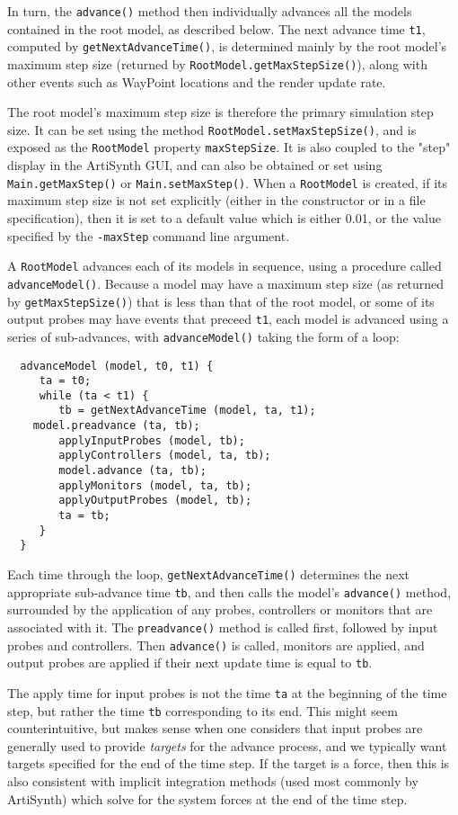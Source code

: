\documentclass{article}
\begin{document}
In turn, the {\tt advance()} method then individually advances all the
models contained in the root model, as described below.  The next
advance time {\tt t1}, computed by {\tt getNextAdvanceTime()}, is
determined mainly by the root model's maximum step size (returned by
{\tt RootModel.getMaxStep\-Size()}), along with other events such as
WayPoint locations and the render update rate.

The root model's maximum step size is therefore the primary simulation
step size. It can be set using the method
{\tt RootModel.setMaxStepSize()}, and is exposed as the {\tt RootModel}
property {\tt maxStepSize}.  It is also coupled to the "step" display in
the ArtiSynth GUI, and can also be obtained or set using
{\tt Main.getMaxStep()} or {\tt Main.setMaxStep()}. When a {\tt RootModel} is
created, if its maximum step size is not set explicitly (either in the
constructor or in a file specification), then it is set to a default
value which is either 0.01, or the value specified by the {\tt -maxStep}
command line argument.

A {\tt RootModel} advances each of its models in sequence, using a
procedure called {\tt advanceModel()}. Because a model may have a
maximum step size (as returned by {\tt getMaxStepSize()}) that is less
than that of the root model, or some of its output probes may have
events that preceed {\tt t1}, each model is advanced using
a series of sub-advances, with {\tt advanceModel()} taking the
form of a loop:
\begin{lstlisting}
  advanceModel (model, t0, t1) {
     ta = t0;
     while (ta < t1) {
        tb = getNextAdvanceTime (model, ta, t1);
	model.preadvance (ta, tb);
        applyInputProbes (model, tb);
        applyControllers (model, ta, tb);
        model.advance (ta, tb);
        applyMonitors (model, ta, tb);
        applyOutputProbes (model, tb);
        ta = tb;
     }
  }
\end{lstlisting}
Each time through the loop, {\tt getNextAdvanceTime()} determines the
next appropriate sub-advance time {\tt tb}, and then calls the model's
{\tt advance()} method, surrounded by the application of any probes,
controllers or monitors that are associated with it.
The {\tt preadvance()} method is called first, followed
by input probes and controllers.
Then {\tt advance()} is called, monitors are applied, and
output probes are applied if their next update time is equal to
{\tt tb}.

\begin{sideblock}
The apply time for input probes is not the time {\tt ta}
at the beginning of the time step, but rather the time {\tt tb}
corresponding to its end. This might seem
counterintuitive, but makes sense when one considers that
input probes are generally used to provide {\it targets}
for the advance process, and we typically want targets
specified for the end of the time step. If the target is a force,
then this is also consistent with implicit integration methods (used
most commonly by ArtiSynth) which solve for the system forces
at the end of the time step.
\end{sideblock}
\end{document}
